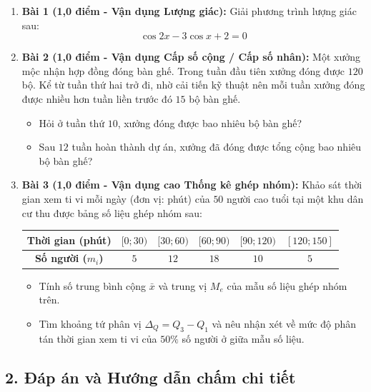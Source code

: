 \documentclass[12pt, a4paper]{article}
\begin{document}
\begin{enumerate}[leftmargin=0.6cm]
    \item \textbf{Bài 1 (1,0 điểm - Vận dụng Lượng giác):}
    Giải phương trình lượng giác sau:
    $$\cos 2x - 3\cos x + 2 = 0$$

    \item \textbf{Bài 2 (1,0 điểm - Vận dụng Cấp số cộng / Cấp số nhân):}
    Một xưởng mộc nhận hợp đồng đóng bàn ghế. Trong tuần đầu tiên xưởng đóng được $120$ bộ. Kể từ tuần thứ hai trở đi, nhờ cải tiến kỹ thuật nên mỗi tuần xưởng đóng được nhiều hơn tuần liền trước đó $15$ bộ bàn ghế.
    \begin{itemize}[leftmargin=0.6cm]
        \item[a)] Hỏi ở tuần thứ $10$, xưởng đóng được bao nhiêu bộ bàn ghế?
        \item[b)] Sau $12$ tuần hoàn thành dự án, xưởng đã đóng được tổng cộng bao nhiêu bộ bàn ghế?
    \end{itemize}

    \item \textbf{Bài 3 (1,0 điểm - Vận dụng cao Thống kê ghép nhóm):}
    Khảo sát thời gian xem ti vi mỗi ngày (đơn vị: phút) của $50$ người cao tuổi tại một khu dân cư thu được bảng số liệu ghép nhóm sau:
    \begin{center}
    \small
    \begin{tabular}{|c|c|c|c|c|c|}
    \hline
    \textbf{Thời gian (phút)} & $[0; 30)$ & $[30; 60)$ & $[60; 90)$ & $[90; 120)$ & $[120; 150]$ \\ \hline
    \textbf{Số người ($m_i$)} & $5$ & $12$ & $18$ & $10$ & $5$ \\ \hline
    \end{tabular}
    \end{center}
    \begin{itemize}[leftmargin=0.6cm]
        \item[a)] Tính số trung bình cộng $\bar{x}$ và trung vị $M_e$ của mẫu số liệu ghép nhóm trên.
        \item[b)] Tìm khoảng tứ phân vị $\Delta_Q = Q_3 - Q_1$ và nêu nhận xét về mức độ phân tán thời gian xem ti vi của $50\%$ số người ở giữa mẫu số liệu.
    \end{itemize}
\end{enumerate}

\subsection*{2. Đáp án và Hướng dẫn chấm chi tiết}
\end{document}
